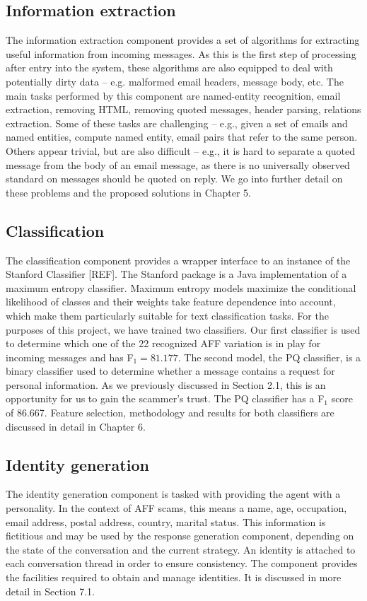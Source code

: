 \subsection*{Information extraction}
The information extraction component provides a set of algorithms for extracting useful information from incoming messages. As this is the first step of processing after entry into the system, these algorithms are also equipped to deal with potentially dirty data -- e.g. malformed email headers, message body, etc. The main tasks performed by this component are named-entity recognition, email extraction, removing HTML, removing quoted messages, header parsing, relations extraction. Some of these tasks are challenging -- e.g., given a set of emails and named entities, compute named entity, email pairs that refer to the same person. Others appear trivial, but are also difficult -- e.g., it is hard to separate a quoted message from the body of an email message, as there is no universally observed standard on messages should be quoted on reply. We go into further detail on these problems and the proposed solutions in Chapter 5.

\subsection*{Classification}
The classification component provides a wrapper interface to an instance of the Stanford Classifier [REF]. The Stanford package is a Java implementation of a maximum entropy classifier. Maximum entropy models maximize the conditional likelihood of classes and their weights take feature dependence into account, which make them particularly suitable for text classification tasks. For the purposes of this project, we have trained two classifiers. Our first classifier is used to determine which one of the 22 recognized AFF variation is in play for incoming messages and has F$_{1} = 81.177$. The second model, the PQ classifier, is a binary classifier used to determine whether a message contains a request for personal information. As we previously discussed in Section 2.1, this is an opportunity for us to gain the scammer's trust. The PQ classifier has a F$_{1}$ score of 86.667. Feature selection, methodology and results for both classifiers are discussed in detail in Chapter 6.

\subsection*{Identity generation}
The identity generation component is tasked with providing the agent with a personality. In the context of AFF scams, this means a name, age, occupation, email address, postal address, country, marital status. This information is fictitious and may be used by the response generation component, depending on the state of the conversation and the current strategy. An identity is attached to each conversation thread in order to ensure consistency. The component provides the facilities required to obtain and manage identities. It is discussed in more detail in Section 7.1.


